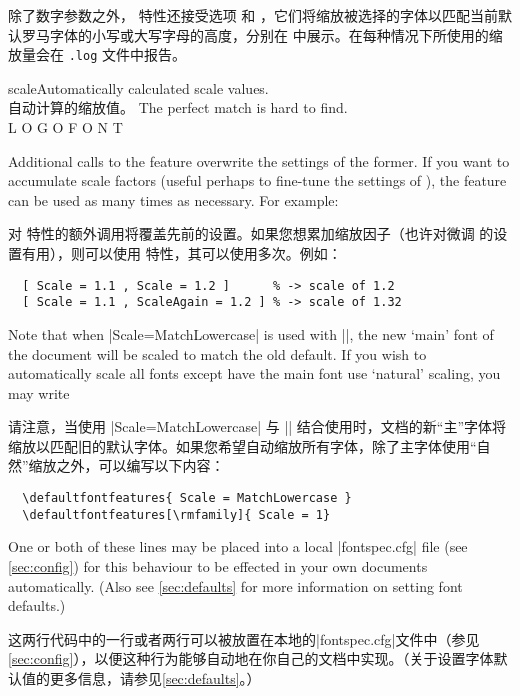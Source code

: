 \documentclass[a4paper]{l3doc}
\begin{document}
除了数字参数之外， 特性还接受选项  和 ，它们将缩放被选择的字体以匹配当前默认罗马字体的小写或大写字母的高度，分别在  中展示。在每种情况下所使用的缩放量会在 \texttt{.log} 文件中报告。

\begin{Xexample}{scale}{Automatically calculated scale values.\\自动计算的缩放值。}
  \setmainfont{Georgia}
  \newfontfamily{}
   The perfect match {\lc is hard to find.}\\
  \newfontfamily{}
   L O G O \uc F O N T
\end{Xexample}

Additional calls to the  feature overwrite the settings of the former.
If you want to accumulate scale factors (useful perhaps to fine-tune the settings of
), the  feature can be used as many times as
necessary. For example:

对  特性的额外调用将覆盖先前的设置。如果您想累加缩放因子（也许对微调  的设置有用），则可以使用  特性，其可以使用多次。例如：

\begin{Verbatim}
  [ Scale = 1.1 , Scale = 1.2 ]      % -> scale of 1.2
  [ Scale = 1.1 , ScaleAgain = 1.2 ] % -> scale of 1.32
\end{Verbatim}

Note that when |Scale=MatchLowercase| is used with |\setmainfont|, the new `main'
font of the document will be scaled to match the old default.
If you wish to automatically scale all fonts except have the main font use `natural'
scaling, you may write

请注意，当使用 |Scale=MatchLowercase| 与 |\setmainfont| 结合使用时，文档的新“主”字体将缩放以匹配旧的默认字体。如果您希望自动缩放所有字体，除了主字体使用“自然”缩放之外，可以编写以下内容：
\begin{Verbatim}
  \defaultfontfeatures{ Scale = MatchLowercase }
  \defaultfontfeatures[\rmfamily]{ Scale = 1}
\end{Verbatim}
One or both of these lines may be placed into a local |fontspec.cfg| file
(see \vref{sec:config}) for this behaviour to be effected in your own documents
automatically.
(Also see \vref{sec:defaults} for more information on setting font defaults.)

这两行代码中的一行或者两行可以被放置在本地的|fontspec.cfg|文件中（参见\vref{sec:config}），以便这种行为能够自动地在你自己的文档中实现。（关于设置字体默认值的更多信息，请参见\vref{sec:defaults}。）
\end{document}
